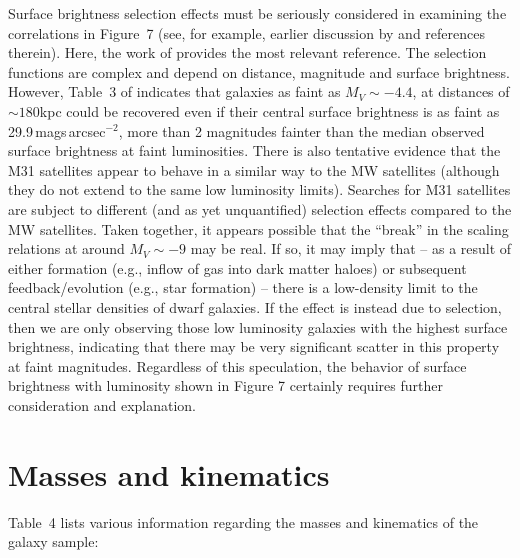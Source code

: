 \documentclass[manuscript]{aastex}
\begin{document}
Surface brightness selection effects must be seriously considered in
examining the correlations in Figure~7 (see, for example, earlier
discussion by \citealt{impey1997} and references therein). Here, the
work of \cite{koposov2008} provides the most relevant reference. The
selection functions are complex and depend on distance, magnitude and
surface brightness. However, Table~3 of \cite{koposov2008} indicates
that galaxies as faint as $M_V \sim -4.4$, at distances of $\sim
180$kpc could be recovered even if their central surface brightness is as
faint as 29.9\,mags\,arcsec$^{-2}$, more than 2 magnitudes fainter than
the median observed surface brightness at faint luminosities. There is
also tentative evidence that the M31 satellites appear to behave in a
similar way to the MW satellites (although they do not extend to the
same low luminosity limits). Searches for M31 satellites are subject to
different (and as yet unquantified) selection effects compared to the
MW satellites. Taken together, it appears possible that the ``break'' in the scaling
relations at around $M_V \sim -9$ may be real. If so, it may imply
that -- as a result of either formation (e.g., inflow of gas into dark
matter haloes) or subsequent feedback/evolution (e.g., star formation)
-- there is a low-density limit to the central stellar densities of
dwarf galaxies. If the effect is instead due to selection, then we are
only observing those low luminosity galaxies with the highest surface
brightness, indicating that there may be very significant scatter in this
property at faint magnitudes. Regardless of this speculation, the
behavior of surface brightness with luminosity shown in Figure 7
certainly requires further consideration and explanation.


\section{Masses and kinematics}

Table~4 lists various information regarding the masses and kinematics
of the galaxy sample:
\end{document}
